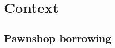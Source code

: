 \documentclass[oneside,11pt]{article}
\begin{document}

\section{Context} \label{context}

\subsection{Pawnshop borrowing}
    
\end{document}
